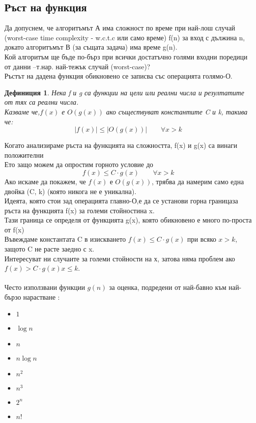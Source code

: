 \documentclass[fleqn, 12pt]{article}
\newtheorem{definition}{Дефиниция}[subsection]
\theoremstyle{definition}
\begin{document}
\subsection{Ръст на функция}
Да допуснем, че алгоритъмът А има сложност по време при най-лош случай (worst-case time complexity - w.c.t.c или само време) f(n) за вход с дължина n, докато алгоритъмът В (за същата задача) има време g(n). \\
Кой алгоритъм ще бъде по-бърз при всички достатъчно голями входни поредици от данни –т.нар. най-тежък случай (worst-case)? \\
Ръстът на дадена функция обикновено се записва със операцията голямо-О.
\begin{definition}
Нека f и g са функции на цели или реални числа и резултатите от тях са реални числа.\\
Казваме че,$f(x)$ е $O(g(x))$ ако съществуват константите C и k, такива че:  
$$|f(x)| \leq |O(g(x))| \qquad \forall x > k$$
\end{definition}
Когато анализираме ръста на функцията на сложността, f(x) и g(x) са винаги положителни\\
Ето защо можем да опростим горното условие до
$$f(x) \leq C \cdot g(x) \qquad \forall x > k$$
Ако искаме да покажем, че $f(x)$ е $O(g(x))$, трябва да намерим само една двойка (C, k) (която никога не е уникална).\\
Идеята, която стои зад операцията главно-О,е да се установи горна границаза ръста на функцията f(x) за големи стойностина x. \\
Тази граница се определя от функцията g(x), която обикновено е много по-проста от f(x)\\
Въвеждаме константата C в изискването $f(x) \leq C \cdot g(x)$  при всяко $x > k$, защото C не расте заедно с x.\\
Интересуват ни случаите за големи стойности на х, затова няма проблем ако $f(x) > C \cdot g(x)  x \leq k $. \\
\\
Често използвани функции $g(n)$ за оценка, подредени от най-бавно към най-бързо нарастване :
\begin{itemize}
\item $1$ 
\item $\log n$ 
\item $n$ 
\item $n \log n$ 
\item $n^2$ 
\item $n^3$ 
\item $2^n$ 
\item $n!$ 
\end{itemize}
\end{document}
